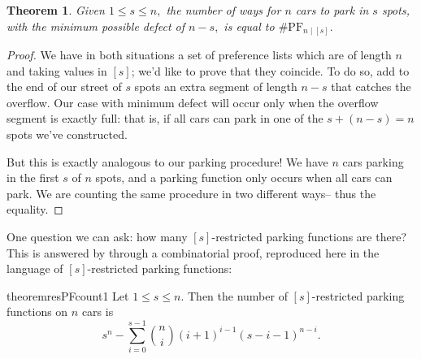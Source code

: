 \documentclass[12 pt]{amsart}
\newtheorem{theorem}{Theorem}[section]
\theoremstyle{definition} %
\theoremstyle{remark} %
\begin{document}
\begin{theorem}
    Given $1\le s\le n,$ the number of ways for $n$ cars to park in $s$ spots, with the minimum possible defect of $n-s,$ is equal to $\# \mathrm{PF}_{n \mid [s]}.$
\end{theorem}

\begin{proof}
    We have in both situations a set of preference lists which are of length $n$ and taking values in $[s]$; we'd like to prove that they coincide. To do so, add to the end of our street of $s$ spots an extra segment of length $n-s$ that catches the overflow. Our case with minimum defect will occur only when the overflow segment is exactly full: that is, if all cars can park in one of the $s+(n-s)=n$ spots we've constructed.

    But this is exactly analogous to our parking procedure! We have $n$ cars parking in the first $s$ of $n$ spots, and a parking function only occurs when all cars can park. We are counting the same procedure in two different ways-- thus the equality.
\end{proof}

One question we can ask: how many $[s]$-restricted parking functions are there? This is answered by \cite{cameron-johannsen-prellberg-schweitzer-2008} through a combinatorial proof, reproduced here in the language of $[s]$-restricted parking functions:

\begin{restatable}{theorem}{resPFcount1}
    \label{thm:resPFcount1}
    Let $1\le s\le n.$ Then the number of $[s]$-restricted parking functions on $n$ cars is
    \[s^{n} - \sum_{i = 0}^{s - 1} \binom{n}{i} (i + 1)^{i - 1} (s - i - 1)^{n - i}.\]
\end{restatable}
\end{document}
